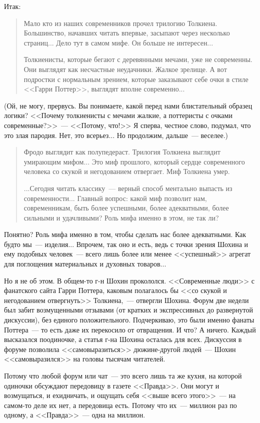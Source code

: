 \documentclass{scrbook}
\makeatletter
\newcommand{\flqq}{<<}
\newcommand{\frqq}{>>}
\newcommand{\mdash}{~--- }
\newcommand{\commamdash}{~--- } %
\newcommand{\inlineauthor}[1]{\emph{#1}}
\newcommand{\myquotation}[2][\@empty]{
	\begin{quotation}
	#2

	\ifx\@empty#1
	\else
		\nopagebreak	
		\inlineauthor{#1}
	\fi
	\end{quotation}
}
\makeatother
\begin{document}
Итак: 
\myquotation{

Мало кто из наших современников прочел трилогию Толкиена. Большинство, начавших читать впервые, засыпают через несколько страниц... Дело тут в самом мифе. Он больше не интересен...

Толкиенисты, которые бегают с деревянными мечами, уже не современны. Они выглядят как несчастные неудачники. Жалкое зрелище. А вот подростки с нормальным зрением, которые заказывают себе очки в стиле {\flqq}Гарри Поттер{\frqq}, выглядят вполне современно...}

(Ой, не могу, прервусь. Вы понимаете, какой перед нами блистательный образец логики? {\flqq}Почему толкиенисты с мечами жалкие, а поттеристы с очками современные?{\frqq}{\mdash}{\flqq}Потому, что!{\frqq} Я сперва, честное слово, подумал, что это злая пародия. Нет, это всерьез... Но продолжим, дальше{\mdash}веселее.)

\myquotation{Фродо выглядит как полупедераст. Трилогия Толкиена выглядит умирающим мифом... Это миф прошлого, который сердце современного человека со скукой и негодованием отвергает. Миф Толкиена умер.

...Сегодня читать классику{\mdash}верный способ ментально выпасть из современности... Главный вопрос: какой миф позволит нам, современникам, быть более успешными, более адекватными, более сильными и удачливыми? Роль мифа именно в этом, не так ли?}

Понятно? Роль мифа именно в том, чтобы сделать нас более адекватными. Как будто мы{\mdash}изделия... Впрочем, так оно и есть, ведь с точки зрения Шохина и ему подобных человек{\mdash}всего лишь более или менее {\flqq}успешный{\frqq} агрегат для поглощения материальных и духовных товаров...

Но я не об этом. В общем-то г-н Шохин прокололся. {\flqq}Современные люди{\frqq} с фанатского сайта Гарри Поттера, каковым полагалось бы {\flqq}со скукой и негодованием отвергнуть{\frqq} Толкиена,{\commamdash}отвергли Шохина. Форум две недели был забит возмущенными отзывами (от кратких и экспрессивных до развернутой дискуссии), без единого положительного. Подчеркиваю, это были именно фанаты Поттера{\mdash}то есть даже их перекосило от отвращения. И что? А ничего. Каждый высказался поодиночке, а статья г-на Шохина осталась для всех. Дискуссия в форуме позволила {\flqq}самовыразиться{\frqq} дюжине-другой людей{\mdash}Шохин {\flqq}самовыразился{\frqq} на головы тысячам читателей.

Потому что любой форум или чат{\mdash}это всего лишь та же кухня, на которой одиночки обсуждают передовицу в газете {\flqq}Правда{\frqq}. Они могут и возмущаться, и ехидничать, и ощущать себя {\flqq}выше всего этого{\frqq}{\mdash}на самом-то деле их нет, а передовица есть. Потому что их{\mdash}миллион раз по одному, а {\flqq}Правда{\frqq}{\mdash}одна на миллион.
\end{document}
